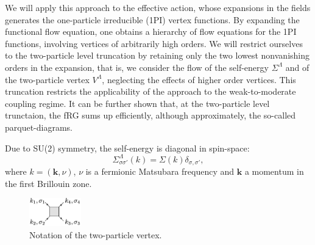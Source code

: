 We will apply this approach to the effective action, whose expansions in the fields generates the one-particle irreducible (1PI) vertex functions. By expanding the functional flow equation,\cite{Wetterich1993} one obtains a hierarchy of flow equations for the 1PI functions, involving vertices of arbitrarily  high orders. 
We will restrict ourselves to the two-particle level truncation by retaining only the two lowest nonvanishing orders in the expansion, that is, we consider the flow of the self-energy $\Sigma^\Lambda$ and of the two-particle vertex $V^\Lambda$, neglecting the effects of higher order vertices. 
This truncation restricts the applicability of the approach to the weak-to-moderate coupling regime.\cite{Salmhofer2001} 
It can be further shown that, at the two-particle level trunctaion, the fRG sums up efficiently, although approximately, the so-called parquet-diagrams.\cite{Kugler2017}
  
Due to SU(2) symmetry, the self-energy is diagonal in spin-space: 
\begin{equation}
\Sigma^\Lambda_{\sigma\sigma'}(k)=\Sigma(k)\delta_{\sigma,\sigma'}, 
\end{equation}
where $k=(\mathbf{k},\nu)$, $\nu$ is a fermionic Matsubara frequency and $\mathbf{k}$ a momentum in the first Brillouin zone. 
\begin{figure}[t!]
\includegraphics[width=0.2\textwidth]{images/VertexBox.png}
\caption{Notation of the two-particle vertex.} 
\label{fig:notvert} 
\end{figure}


